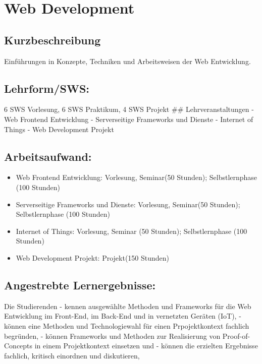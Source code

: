\chapter{Web Development}\label{web-development}

\section{Kurzbeschreibung}\label{kurzbeschreibung-6}

Einführungen in Konzepte, Techniken und Arbeitsweisen der Web
Entwicklung.

\section{Lehrform/SWS:}\label{lehrformsws-25}

6 SWS Vorlesung, 6 SWS Praktikum, 4 SWS Projekt \#\# Lehrveranstaltungen
- Web Frontend Entwicklung - Serverseitige Frameworks und Dienste -
Internet of Things - Web Development Projekt

\section{Arbeitsaufwand:}\label{arbeitsaufwand-25}

\begin{itemize}
\item
  Web Frontend Entwicklung: Vorlesung, Seminar(50 Stunden);
  Selbstlernphase (100 Stunden)
\item
  Serverseitige Frameworks und Dienste: Vorlesung, Seminar(50 Stunden);
  Selbstlernphase (100 Stunden)
\item
  Internet of Things: Vorlesung, Seminar (50 Stunden); Selbstlernphase
  (100 Stunden)
\item
  Web Development Projekt: Projekt(150 Stunden)
\end{itemize}

\section{Angestrebte
Lernergebnisse:}\label{angestrebte-lernergebnisse-30}

Die Studierenden - kennen ausgewählte Methoden und Frameworks für die
Web Entwicklung im Front-End, im Back-End und in vernetzten Geräten
(IoT), - können eine Methoden und Technologiewahl für einen
Prpojektkontext fachlich begründen, - können Frameworks und Methoden zur
Realisierung von Proof-of-Concepts in einem Projektkontext einsetzen und
- können die erzielten Ergebnisse fachlich, kritisch einordnen und
diskutieren,

